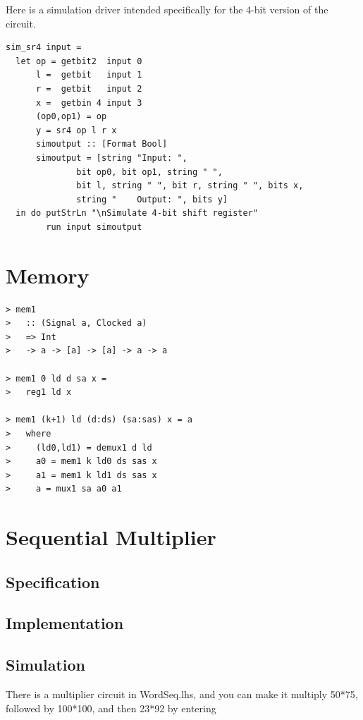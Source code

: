\documentclass[a4paper,openany,fleqn]{book}
\begin{document}
Here is a simulation driver intended specifically for the 4-bit
version of the circuit.

\begin{verbatim}
sim_sr4 input =
  let op = getbit2  input 0
      l =  getbit   input 1
      r =  getbit   input 2
      x =  getbin 4 input 3
      (op0,op1) = op
      y = sr4 op l r x
      simoutput :: [Format Bool]
      simoutput = [string "Input: ",
              bit op0, bit op1, string " ",
              bit l, string " ", bit r, string " ", bits x,
              string "    Output: ", bits y]
  in do putStrLn "\nSimulate 4-bit shift register"
        run input simoutput
\end{verbatim}

\section{Memory}
\label{sec:memory}

\begin{verbatim}
> mem1
>   :: (Signal a, Clocked a)
>   => Int
>   -> a -> [a] -> [a] -> a -> a

> mem1 0 ld d sa x =
>   reg1 ld x

> mem1 (k+1) ld (d:ds) (sa:sas) x = a
>   where
>     (ld0,ld1) = demux1 d ld
>     a0 = mem1 k ld0 ds sas x
>     a1 = mem1 k ld1 ds sas x
>     a = mux1 sa a0 a1
\end{verbatim}

\section{Sequential Multiplier}
\label{sec:sequ-mult}

\subsection{Specification}
\label{sec:mult-specification}

\subsection{Implementation}
\label{sec:mult-implementation}

\subsection{Simulation}
\label{sec:mult-simulation}

There is a multiplier circuit in WordSeq.lhs, and you can make it
multiply 50*75, followed by 100*100, and then 23*92 by entering
\end{document}
